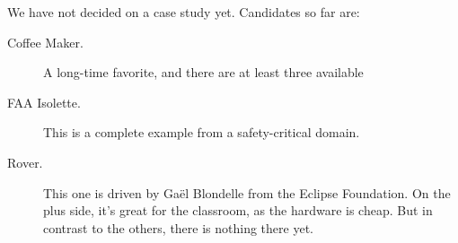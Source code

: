 We have not decided on a case study yet.  Candidates so far are:

\begin{description}
\item[Coffee Maker.] A long-time favorite, and there are at least three available
\item[FAA Isolette.] This is a complete example from a safety-critical domain. 
\item[Rover.] This one is driven by Gaël Blondelle from the Eclipse Foundation. On the plus side, it's great for the classroom, as the hardware is cheap. But in contrast to the others, there is nothing there yet. 
\end{description}
